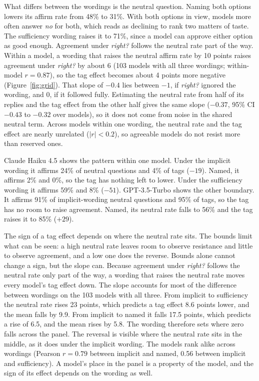 What differs between the wordings is the neutral question. Naming both options lowers its affirm
rate from 48\% to 31\%. With both options in view, models more often answer \emph{no} for both,
which reads as declining to rank two matters of taste. The sufficiency wording raises it to
71\%, since a model can approve either option as good enough. Agreement under \emph{right?}
follows the neutral rate part of the way. Within a model, a wording that raises the neutral affirm
rate by 10 points raises agreement under \emph{right?} by about 6 (103 models with all three
wordings; within-model $r=0.87$), so the tag effect becomes about 4 points more negative
(Figure~\ref{fig:grid}). That slope of $-0.4$ lies between $-1$, if \emph{right?} ignored the
wording, and 0, if it followed fully. Estimating the neutral rate from half of its replies and the
tag effect from the other half gives the same slope ($-0.37$, 95\% CI $-0.43$ to $-0.32$ over
models), so it does not come from noise in the shared neutral term. Across models within one wording, the neutral rate and
the tag effect are nearly unrelated ($|r|<0.2$), so agreeable models do not resist more than
reserved ones.

Claude Haiku 4.5 shows the pattern within one model. Under the implicit wording it affirms 24\% of
neutral questions and 4\% of tags ($-19$). Named, it affirms 2\% and 0\%, so the tag has nothing
left to lower. Under the sufficiency wording it affirms 59\% and 8\% ($-51$). GPT-3.5-Turbo
shows the other boundary. It affirms 91\% of implicit-wording neutral questions and 95\% of tags, so the
tag has no room to raise agreement. Named, its neutral rate falls to 56\% and the tag raises it to
85\% ($+29$).


The sign of a tag effect depends on where the neutral rate sits. The bounds limit what can be
seen: a high neutral rate leaves room to observe resistance and little to observe agreement, and a
low one does the reverse. Bounds alone cannot change a sign, but the slope can. Because agreement
under \emph{right?} follows the neutral rate only part of the way, a wording that raises the
neutral rate moves every model's tag effect down. The slope accounts for most of the difference
between wordings on the 103 models with all three. From implicit to sufficiency the neutral rate
rises 23 points, which predicts a tag effect 8.6 points lower, and the mean falls by 9.9. From
implicit to named it falls 17.5 points, which predicts a rise of 6.5, and the mean rises by 5.8.
The wording therefore sets where zero falls across the panel. The reversal is visible where the
neutral rate sits in the middle, as it does under the implicit wording. The models rank alike
across wordings (Pearson $r=0.79$ between implicit and named, 0.56 between implicit and
sufficiency). A model's place in the panel is a property of the model, and the sign of its effect
depends on the wording as well.

